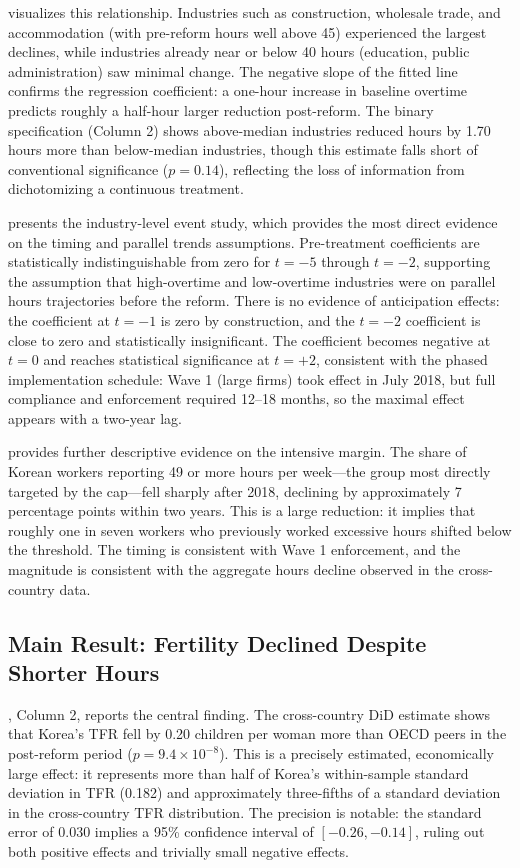 \documentclass[12pt]{article}
\begin{document}
 visualizes this relationship. Industries such as construction, wholesale trade, and accommodation (with pre-reform hours well above 45) experienced the largest declines, while industries already near or below 40 hours (education, public administration) saw minimal change. The negative slope of the fitted line confirms the regression coefficient: a one-hour increase in baseline overtime predicts roughly a half-hour larger reduction post-reform. The binary specification (Column 2) shows above-median industries reduced hours by 1.70 hours more than below-median industries, though this estimate falls short of conventional significance ($p = 0.14$), reflecting the loss of information from dichotomizing a continuous treatment.

 presents the industry-level event study, which provides the most direct evidence on the timing and parallel trends assumptions. Pre-treatment coefficients are statistically indistinguishable from zero for $t = -5$ through $t = -2$, supporting the assumption that high-overtime and low-overtime industries were on parallel hours trajectories before the reform. There is no evidence of anticipation effects: the coefficient at $t = -1$ is zero by construction, and the $t = -2$ coefficient is close to zero and statistically insignificant. The coefficient becomes negative at $t = 0$ and reaches statistical significance at $t = +2$, consistent with the phased implementation schedule: Wave 1 (large firms) took effect in July 2018, but full compliance and enforcement required 12--18 months, so the maximal effect appears with a two-year lag.

 provides further descriptive evidence on the intensive margin. The share of Korean workers reporting 49 or more hours per week---the group most directly targeted by the cap---fell sharply after 2018, declining by approximately 7 percentage points within two years. This is a large reduction: it implies that roughly one in seven workers who previously worked excessive hours shifted below the threshold. The timing is consistent with Wave 1 enforcement, and the magnitude is consistent with the aggregate hours decline observed in the cross-country data.

\subsection{Main Result: Fertility Declined Despite Shorter Hours}

, Column 2, reports the central finding. The cross-country DiD estimate shows that Korea's TFR fell by 0.20 children per woman more than OECD peers in the post-reform period ($p = 9.4 \times 10^{-8}$). This is a precisely estimated, economically large effect: it represents more than half of Korea's within-sample standard deviation in TFR (0.182) and approximately three-fifths of a standard deviation in the cross-country TFR distribution. The precision is notable: the standard error of 0.030 implies a 95\% confidence interval of $[-0.26, -0.14]$, ruling out both positive effects and trivially small negative effects.
\end{document}
